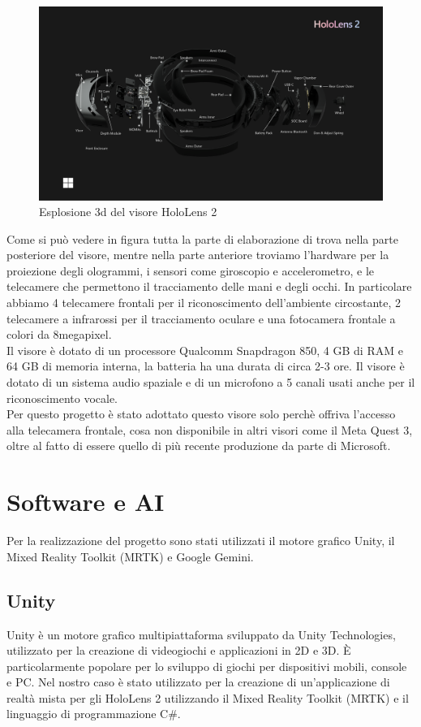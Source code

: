 \begin{figure}[H]
    \includegraphics[width=\textwidth,height=\textheight,keepaspectratio]{figures/chapter_1/hololens2-exploded-view-diagram.png}
    \caption{Esplosione 3d del visore HoloLens 2}
    \centering
\end{figure}
Come si può vedere in figura tutta la parte di elaborazione di trova nella parte posteriore del visore, mentre nella parte anteriore troviamo l'hardware per la proiezione degli ologrammi, i sensori come giroscopio e accelerometro, e le telecamere che permettono il tracciamento delle mani e degli occhi. In particolare abbiamo 4 telecamere frontali per il riconoscimento dell'ambiente circostante, 2 telecamere a infrarossi per il tracciamento oculare e una fotocamera frontale a colori da 8megapixel.\\
Il visore è dotato di un processore Qualcomm Snapdragon 850, 4 GB di RAM e 64 GB di memoria interna, la batteria ha una durata di circa 2-3 ore. Il visore è dotato di un sistema audio spaziale e di un microfono a 5 canali usati anche per il riconoscimento vocale. \cite{WhatIsHoloLens}\\
Per questo progetto è stato adottato questo visore solo perchè offriva l'accesso alla telecamera frontale, cosa non disponibile in altri visori come il Meta Quest 3, oltre al fatto di essere quello di più recente produzione da parte di Microsoft. 

\section{Software e AI}
Per la realizzazione del progetto sono stati utilizzati il motore grafico Unity, il Mixed Reality Toolkit (MRTK) e Google Gemini.

\subsection{Unity}
Unity è un motore grafico multipiattaforma sviluppato da Unity Technologies, utilizzato per la creazione di videogiochi e applicazioni in 2D e 3D. È particolarmente popolare per lo sviluppo di giochi per dispositivi mobili, console e PC. Nel nostro caso è stato utilizzato per la creazione di un'applicazione di realtà mista per gli HoloLens 2 utilizzando il Mixed Reality Toolkit (MRTK) e il linguaggio di programmazione C\#.

